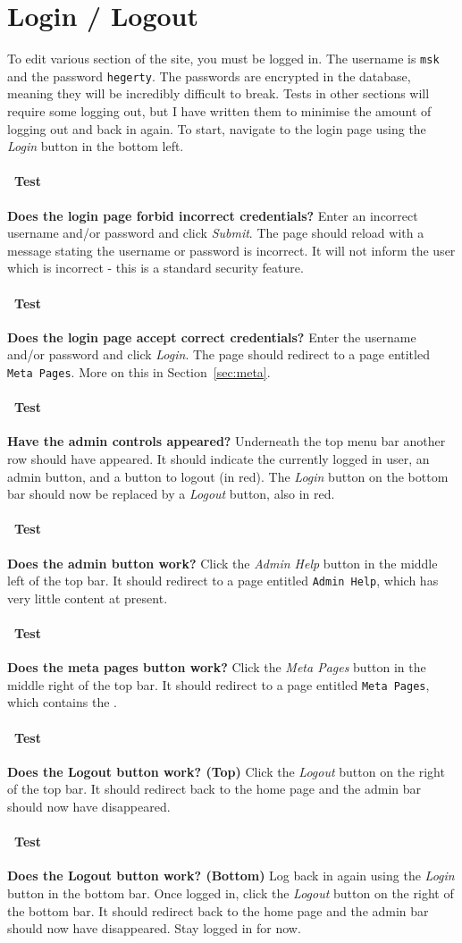 \documentclass[12pt]{article}
\newcounter{Test}
\newcommand{\test}[1]{%
\stepcounter{Test}%
\paragraph{\Circle\ Test \theTest} \textbf{#1} }
\begin{document}
\section{Login / Logout}\label{sec:user}
To edit various section of the site, you must be logged in. The username is \texttt{msk} and the password \texttt{hegerty}. The passwords are encrypted in the database, meaning they will be incredibly difficult to break. Tests in other sections will require some logging out, but I have written them to minimise the amount of logging out and back in again. To start, navigate to the login page using the \textit{Login} button in the bottom left.

\test{Does the login page forbid incorrect credentials?}
Enter an incorrect username and/or password and click \textit{Submit}. The page should reload with a message stating the username or password is incorrect. It will not inform the user which is incorrect - this is a standard security feature.

\test{Does the login page accept correct credentials?}
Enter the username and/or password and click \textit{Login}. The page should redirect to a page entitled \texttt{Meta Pages}. More on this in Section~\ref{sec:meta}.

\test{Have the admin controls appeared?}
Underneath the top menu bar another row should have appeared. It should indicate the currently logged in user, an admin button, and a button to logout (in red). The \textit{Login} button on the bottom bar should now be replaced by a \textit{Logout} button, also in red.

\test{Does the admin button work?}
Click the \textit{Admin Help} button in the middle left of the top bar. It should redirect to a page entitled \texttt{Admin Help}, which has very little content at present.

\test{Does the meta pages button work?}
Click the \textit{Meta Pages} button in the middle right of the top bar. It should redirect to a page entitled \texttt{Meta Pages}, which contains the .

\test{Does the Logout button work? (Top)}
Click the \textit{Logout} button on the right of the top bar. It should redirect back to the home page and the admin bar should now have disappeared.

\test{Does the Logout button work? (Bottom)}
Log back in again using the \textit{Login} button in the bottom bar. Once logged in, click the \textit{Logout} button on the right of the bottom bar. It should redirect back to the home page and the admin bar should now have disappeared. Stay logged in for now.
\end{document}

